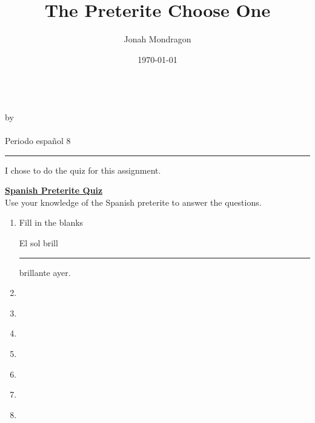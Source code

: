 \documentclass[12pt]{article}
\newcommand{\PutTitle}[1]
{
    \begin{center}
        {\huge\bfseries\thetitle}\\
        by \theauthor\\
        \thedate\\
        #1        
    \end{center}
    \hrule
    \vspace{2ex}
}
\begin{document}
\title{The Preterite Choose One}
\author{Jonah Mondragon}
\date{\today}
\PutTitle{Periodo español 8}

\doublespacing

I chose to do the quiz for this assignment.

\begin{center}
    {\huge\bfseries\underline{Spanish Preterite Quiz}}\\
    Use your knowledge of the Spanish preterite to answer the questions.
\end{center}

\begin{enumerate}
\item{Fill in the blanks}
    \begin{addmargin}[24pt]{0pt}
    El sol brill\rule[-0.5pt]{5ex}{0.4pt} brillante ayer.
    \end{addmargin}
\item{}
    \begin{addmargin}[24pt]{0pt}
    \end{addmargin}
\item{}
    \begin{addmargin}[24pt]{0pt}
    \end{addmargin}
\item{}
    \begin{addmargin}[24pt]{0pt}
    \end{addmargin}
\item{}
    \begin{addmargin}[24pt]{0pt}
    \end{addmargin}
\item{}
    \begin{addmargin}[24pt]{0pt}
    \end{addmargin}
\item{}
    \begin{addmargin}[24pt]{0pt}
    \end{addmargin}
\item{}
    \begin{addmargin}[24pt]{0pt}
    \end{addmargin}
\end{enumerate}
\end{document}
